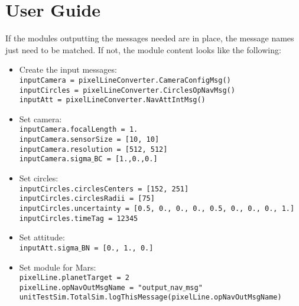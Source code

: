 
\section{User Guide}
If the modules outputting the messages needed are in place, the message names just need to be matched. If not, the module content looks like the following:

\begin{itemize}
\item Create the input messages: \\
\texttt{inputCamera = pixelLineConverter.CameraConfigMsg()} \\
\texttt{inputCircles = pixelLineConverter.CirclesOpNavMsg()}\\
\texttt{inputAtt = pixelLineConverter.NavAttIntMsg()}\\
\item Set camera: \\
\texttt{inputCamera.focalLength = 1.}\\
\texttt{inputCamera.sensorSize = [10, 10]}\\
\texttt{inputCamera.resolution = [512, 512]}\\
\texttt{inputCamera.sigma$\_$BC = [1.,0.,0.]}\\
\item Set circles: \\
\texttt{inputCircles.circlesCenters = [152, 251]}\\
\texttt{inputCircles.circlesRadii = [75]}\\
\texttt{inputCircles.uncertainty = [0.5, 0., 0., 0., 0.5, 0., 0., 0., 1.]}\\
\texttt{inputCircles.timeTag = 12345}\\
\item Set attitude: \\
\texttt{inputAtt.sigma$\_$BN = [0., 1., 0.]}\\
\item Set module for Mars: \\
\texttt{pixelLine.planetTarget = 2}\\
\texttt{pixelLine.opNavOutMsgName = "output$\_$nav$\_$msg"}\\
\texttt{unitTestSim.TotalSim.logThisMessage(pixelLine.opNavOutMsgName)}\\
  \end{itemize}